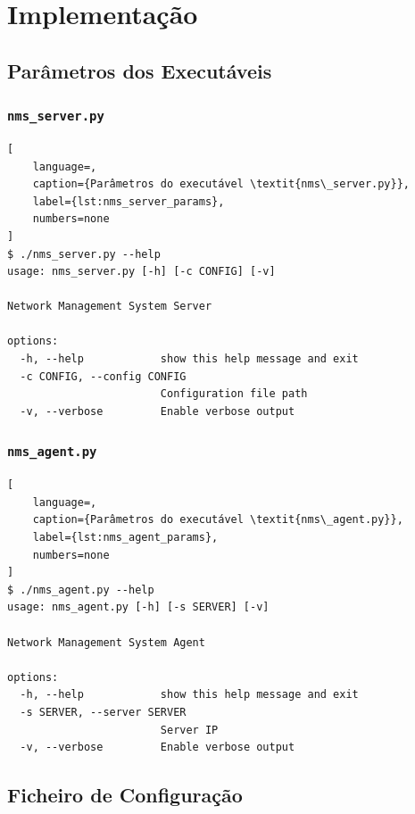 \documentclass[a4paper,12pt]{scrreprt}
\begin{document}

\chapter{Implementação}

\section{Parâmetros dos Executáveis}

\subsection{\texttt{nms\_server.py}}

\begin{lstlisting}[
    language=,
    caption={Parâmetros do executável \textit{nms\_server.py}},
    label={lst:nms_server_params},
    numbers=none
]
$ ./nms_server.py --help
usage: nms_server.py [-h] [-c CONFIG] [-v]

Network Management System Server

options:
  -h, --help            show this help message and exit
  -c CONFIG, --config CONFIG
                        Configuration file path
  -v, --verbose         Enable verbose output
\end{lstlisting}

\subsection{\texttt{nms\_agent.py}}

\begin{lstlisting}[
    language=,
    caption={Parâmetros do executável \textit{nms\_agent.py}},
    label={lst:nms_agent_params},
    numbers=none
]
$ ./nms_agent.py --help
usage: nms_agent.py [-h] [-s SERVER] [-v]

Network Management System Agent

options:
  -h, --help            show this help message and exit
  -s SERVER, --server SERVER
                        Server IP
  -v, --verbose         Enable verbose output
\end{lstlisting}

\section{Ficheiro de Configuração}
\end{document}
